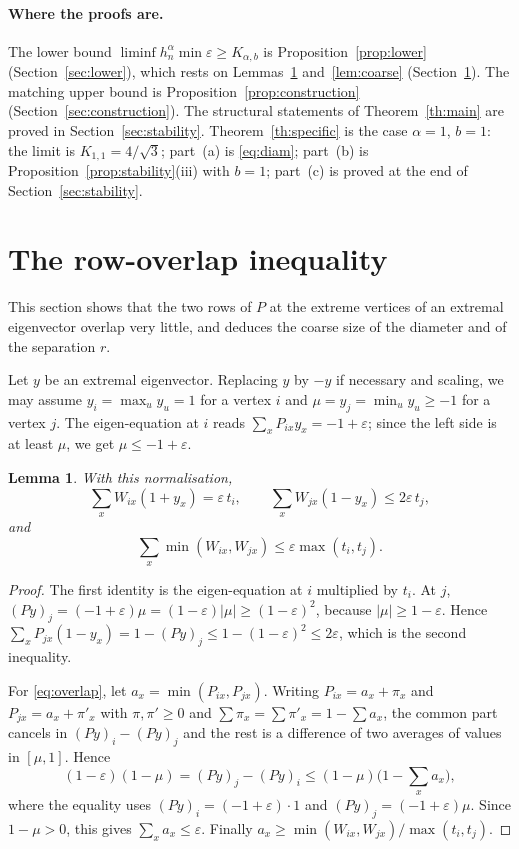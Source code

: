 \documentclass[11pt,a4paper]{article}
\newtheorem{lemma}[theorem]{Lemma}
\theoremstyle{definition}
\newcommand{\eps}{\varepsilon}
\begin{document}
\paragraph{Where the proofs are.}
The lower bound $\liminf h_n^\alpha\min\eps\ge K_{\alpha,b}$ is Proposition~\ref{prop:lower} (Section~\ref{sec:lower}), which rests on Lemmas~\ref{lem:overlap} and~\ref{lem:coarse} (Section~\ref{sec:overlap}). The matching upper bound is Proposition~\ref{prop:construction} (Section~\ref{sec:construction}). The structural statements of Theorem~\ref{th:main} are proved in Section~\ref{sec:stability}. Theorem~\ref{th:specific} is the case $\alpha=1$, $b=1$: the limit is $K_{1,1}=4/\sqrt3$; part~(a) is \eqref{eq:diam}; part~(b) is Proposition~\ref{prop:stability}(iii) with $b=1$; part~(c) is proved at the end of Section~\ref{sec:stability}.

\section{The row-overlap inequality}\label{sec:overlap}
This section shows that the two rows of $P$ at the extreme vertices of an extremal eigenvector overlap very little, and deduces the coarse size of the diameter and of the separation $r$.

Let $y$ be an extremal eigenvector. Replacing $y$ by $-y$ if necessary and scaling, we may assume $y_i=\max_u y_u=1$ for a vertex $i$ and $\mu=y_j=\min_u y_u\ge-1$ for a vertex $j$. The eigen-equation at $i$ reads $\sum_xP_{ix}y_x=-1+\eps$; since the left side is at least $\mu$, we get $\mu\le-1+\eps$.

\begin{lemma}\label{lem:overlap}
With this normalisation,
\begin{equation}\label{eq:two}
 \sum_x W_{ix}(1+y_x)=\eps\,t_i,\qquad \sum_x W_{jx}(1-y_x)\le2\eps\,t_j,
\end{equation}
and
\begin{equation}\label{eq:overlap}
 \sum_x\min(W_{ix},W_{jx})\le\eps\max(t_i,t_j).
\end{equation}
\end{lemma}
\begin{proof}
The first identity is the eigen-equation at $i$ multiplied by $t_i$. At $j$, $(Py)_j=(-1+\eps)\mu=(1-\eps)|\mu|\ge(1-\eps)^2$, because $|\mu|\ge1-\eps$. Hence $\sum_xP_{jx}(1-y_x)=1-(Py)_j\le1-(1-\eps)^2\le2\eps$, which is the second inequality.

For \eqref{eq:overlap}, let $a_x=\min(P_{ix},P_{jx})$. Writing $P_{ix}=a_x+\pi_x$ and $P_{jx}=a_x+\pi'_x$ with $\pi,\pi'\ge0$ and $\sum\pi_x=\sum\pi'_x=1-\sum a_x$, the common part cancels in $(Py)_i-(Py)_j$ and the rest is a difference of two averages of values in $[\mu,1]$. Hence
\[
 (1-\eps)(1-\mu)=(Py)_j-(Py)_i\le(1-\mu)\Big(1-\sum_xa_x\Big),
\]
where the equality uses $(Py)_i=(-1+\eps)\cdot1$ and $(Py)_j=(-1+\eps)\mu$. Since $1-\mu>0$, this gives $\sum_xa_x\le\eps$. Finally $a_x\ge\min(W_{ix},W_{jx})/\max(t_i,t_j)$.
\end{proof}
\end{document}
